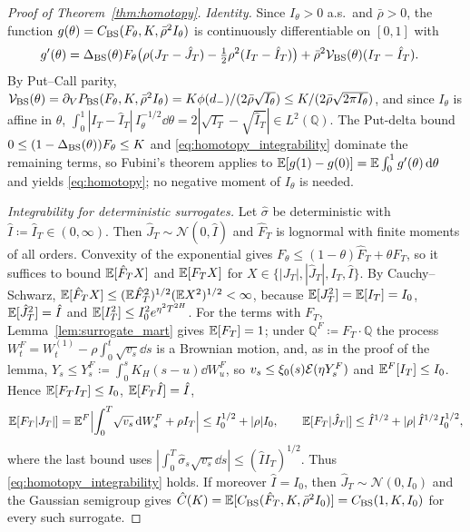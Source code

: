 \begin{proof}[Proof of Theorem~\ref{thm:homotopy}]
\emph{Identity.} Since $I_\theta>0$ a.s.\ and $\bar{\rho}>0$, the function $g(\theta)=C_{\mathrm{BS}}(F_\theta,K,\bar{\rho}^2 I_\theta)$ is continuously differentiable on $[0,1]$ with
\[
  \begin{aligned}
  g'(\theta) &= \Delta_{\mathrm{BS}}(\theta)F_\theta\bigl(\rho(J_T-\hat{J}_T)-\tfrac12\rho^2(I_T-\hat{I}_T)\bigr)
                + \bar{\rho}^2\mathcal{V}_{\mathrm{BS}}(\theta)(I_T-\hat{I}_T).
  \end{aligned}
\]
By Put--Call parity, $\mathcal{V}_{\mathrm{BS}}(\theta)=\partial_V P_{\mathrm{BS}}(F_\theta,K,\bar{\rho}^2 I_\theta)=K\phi(d_-)/(2\bar{\rho}\sqrt{I_\theta})\le K/(2\bar{\rho}\sqrt{2\pi I_\theta})$, and since $I_\theta$ is affine in $\theta$, $\int_0^1 |I_T-\hat{I}_T|\,I_\theta^{-1/2}\dd\theta = 2|\sqrt{I_T}-\sqrt{\hat{I}_T}|\in L^2(\mathbb{Q})$. The Put-delta bound $0\le(1-\Delta_{\mathrm{BS}}(\theta))F_\theta\le K$ and \eqref{eq:homotopy_integrability} dominate the remaining terms, so Fubini's theorem applies to $\mathbb{E}[g(1)-g(0)]=\mathbb{E}\int_0^1g'(\theta)\,\mathrm{d}\theta$ and yields \eqref{eq:homotopy}; no negative moment of $I_\theta$ is needed.

\emph{Integrability for deterministic surrogates.} Let $\hat{\sigma}$ be deterministic with $\hat{I}\coloneqq\hat{I}_T\in(0,\infty)$. Then $\hat{J}_T\sim\mathcal{N}(0,\hat{I})$ and $\hat{F}_T$ is lognormal with finite moments of all orders. Convexity of the exponential gives $F_\theta\le(1-\theta)\hat{F}_T+\theta F_T$, so it suffices to bound $\mathbb{E}[\hat{F}_TX]$ and $\mathbb{E}[F_TX]$ for $X\in\{|J_T|,|\hat{J}_T|,I_T,\hat{I}\}$. By Cauchy--Schwarz, $\mathbb{E}[\hat{F}_TX]\le(\mathbb{E}\hat{F}_T^2)^{1/2}(\mathbb{E} X^2)^{1/2}<\infty$, because $\mathbb{E}[J_T^2]=\mathbb{E}[I_T]=I_0$, $\mathbb{E}[\hat{J}_T^2]=\hat{I}$ and $\mathbb{E}[I_T^2]\le I_0^2e^{\eta^2T^{2H}}$. For the terms with $F_T$, Lemma~\ref{lem:surrogate_mart} gives $\mathbb{E}[F_T]=1$; under $\mathbb{Q}^F\coloneqq F_T\cdot\mathbb{Q}$ the process $W_t^F=W_t^{(1)}-\rho\int_0^t\sqrt{v_s}\dd s$ is a Brownian motion, and, as in the proof of the lemma, $Y_s\le Y_s^F\coloneqq\int_0^sK_H(s-u)\dd W_u^F$, so $v_s\le\xi_0(s)\mathcal{E}(\eta Y_s^F)$ and $\mathbb{E}^F[I_T]\le I_0$. Hence $\mathbb{E}[F_TI_T]\le I_0$, $\mathbb{E}[F_T\hat{I}]=\hat{I}$,
\[
  \begin{gathered}
  \mathbb{E}[F_T|J_T|]=\mathbb{E}^F\Bigl|\int_0^T\!\sqrt{v_s}\,\mathrm{d} W_s^F+\rho I_T\Bigr|\le I_0^{1/2}+|\rho|I_0,
  \qquad
  \mathbb{E}[F_T|\hat{J}_T|]\le\hat{I}^{1/2}+|\rho|\,\hat{I}^{1/2}I_0^{1/2},
  \end{gathered}
\]
where the last bound uses $|\int_0^T\hat{\sigma}_s\sqrt{v_s}\dd s|\le(\hat{I}I_T)^{1/2}$. Thus \eqref{eq:homotopy_integrability} holds. If moreover $\hat{I}=I_0$, then $\hat{J}_T\sim\mathcal{N}(0,I_0)$ and the Gaussian semigroup gives $\hat{C}(K)=\mathbb{E}[C_{\mathrm{BS}}(\hat{F}_T,K,\bar{\rho}^2I_0)]=C_{\mathrm{BS}}(1,K,I_0)$ for every such surrogate.


\end{proof}
